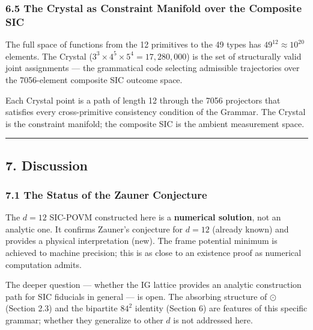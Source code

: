 \documentclass[12pt,a4paper]{article}
\begin{document}
\hypertarget{the-crystal-as-constraint-manifold-over-the-composite-sic}{%
\subsubsection{6.5 The Crystal as Constraint Manifold over the Composite
SIC}\label{the-crystal-as-constraint-manifold-over-the-composite-sic}}

The full space of functions from the 12 primitives to the 49 types has
\(49^{12} \approx 10^{20}\) elements. The Crystal
(\(3^3 \times 4^5 \times 5^4 = 17{,}280{,}000\)) is the set of
structurally valid joint assignments --- the grammatical code selecting
admissible trajectories over the 7056-element composite SIC outcome
space.

Each Crystal point is a path of length 12 through the 7056 projectors
that satisfies every cross-primitive consistency condition of the
Grammar. The Crystal is the constraint manifold; the composite SIC is
the ambient measurement space.

\begin{center}\rule{0.5\linewidth}{0.5pt}\end{center}

\hypertarget{discussion}{%
\subsection{7. Discussion}\label{discussion}}

\hypertarget{the-status-of-the-zauner-conjecture}{%
\subsubsection{7.1 The Status of the Zauner
Conjecture}\label{the-status-of-the-zauner-conjecture}}

The \(d=12\) SIC-POVM constructed here is a \textbf{numerical solution},
not an analytic one. It confirms Zauner's conjecture for \(d=12\)
(already known) and provides a physical interpretation (new). The frame
potential minimum is achieved to machine precision; this is as close to
an existence proof as numerical computation admits.

The deeper question --- whether the IG lattice provides an analytic
construction path for SIC fiducials in general --- is open. The
absorbing structure of \(\odot\) (Section 2.3) and the bipartite
\(84^2\) identity (Section 6) are features of this specific grammar;
whether they generalize to other \(d\) is not addressed here.
\end{document}
